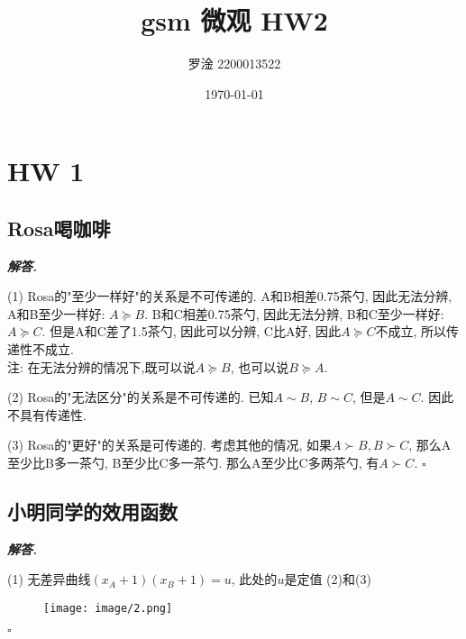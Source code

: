 \documentclass[10pt, a4paper, oneside]{ctexart}
\title{\textbf{gsm 微观 HW2}}
\author{罗淦  2200013522}
\date{\today}
\newenvironment{solution}{%
  \par\noindent\textbf{\textit{解答. }}\ignorespaces
}{%
  \hfill\ensuremath{\square}\par %
}
\begin{document}
\maketitle

\section{HW 1}

\subsection{Rosa喝咖啡}

\begin{solution}
(1) Rosa的"至少一样好"的关系是不可传递的. A和B相差0.75茶勺, 因此无法分辨, A和B至少一样好: $A\succeq B$. B和C相差0.75茶勺, 因此无法分辨, B和C至少一样好:  $A\succeq C$. 但是A和C差了1.5茶勺, 因此可以分辨, C比A好, 因此$A\succeq C$不成立, 所以传递性不成立.\\
注: 在无法分辨的情况下,既可以说$A\succeq B$, 也可以说$B\succeq A$.

(2) Rosa的"无法区分"的关系是不可传递的. 已知$A\sim B$, $B\sim C$, 但是$A\sim C$. 因此不具有传递性.

(3) Rosa的"更好"的关系是可传递的. 考虑其他的情况, 如果$A\succ B, B\succ C$, 那么A至少比B多一茶勺, B至少比C多一茶勺. 那么A至少比C多两茶勺, 有$A\succ C$.
\end{solution}

\subsection{小明同学的效用函数}
\begin{solution}
(1) 无差异曲线$(x_A+1)(x_B+1)=u$, 此处的$u$是定值 
(2)和(3)
\begin{figure}[h]
    \centering
    \texttt{[image: image/2.png]}
\end{figure}   
\end{solution}
\end{document}
